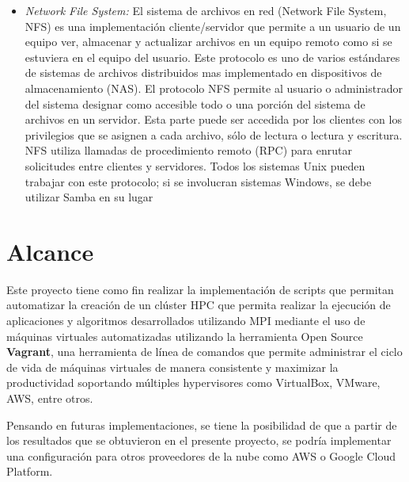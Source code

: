 \documentclass[letterpaper, 12pt, oneside]{article}
\begin{document}
\begin{itemize}
        
        \item \textit{Network File System:} 
        El sistema de archivos en red (Network File System, NFS) es una implementación cliente/servidor que permite a un usuario de un equipo ver, almacenar y actualizar archivos en un equipo remoto como si se estuviera en el equipo del usuario. Este protocolo es uno de varios estándares de sistemas de archivos distribuidos mas implementado en dispositivos de almacenamiento (NAS).
        El protocolo NFS permite al usuario o administrador del sistema designar como accesible todo o una porción del sistema de archivos en un servidor. Esta parte puede ser accedida por los clientes con los privilegios que se asignen a cada archivo, sólo de lectura o lectura y escritura. NFS utiliza llamadas de procedimiento remoto (RPC) para enrutar solicitudes entre clientes y servidores\cite{NFS}.
        Todos los sistemas Unix pueden trabajar con este protocolo; si se involucran sistemas Windows, se debe utilizar Samba en su lugar\cite{NFS2} 
    \end{itemize}
  

    \section{Alcance}
    
    Este proyecto tiene como fin realizar la implementación de scripts que permitan automatizar la creación de un clúster HPC que permita realizar la ejecución de aplicaciones y algoritmos desarrollados utilizando MPI mediante el uso de máquinas virtuales automatizadas utilizando la herramienta Open Source \textbf{Vagrant},  una herramienta de línea de comandos  que permite administrar el ciclo de vida de máquinas virtuales de manera consistente y maximizar la productividad soportando múltiples hypervisores como VirtualBox, VMware, AWS, entre otros.
    
    Pensando en futuras implementaciones, se tiene la posibilidad de que a partir de los resultados que se obtuvieron en el presente proyecto, se podría implementar una configuración para otros proveedores de la nube como AWS o Google Cloud Platform. 
\end{document}
